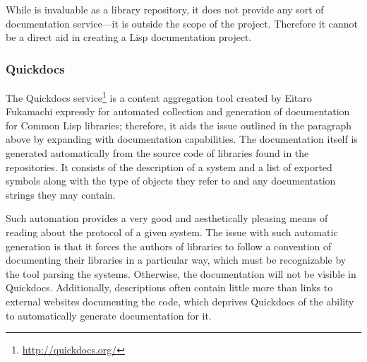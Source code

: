 While \ql{} is invaluable as a library repository, it does not provide any sort of documentation service---it is outside the scope of the \ql{} project. Therefore it cannot be a direct aid in creating a Lisp documentation project.

\subsubsection{Quickdocs}

The Quickdocs service\footnote{\url{http://quickdocs.org/}} is a content aggregation tool created by Eitaro Fukamachi expressly for automated collection and generation of documentation for Common Lisp libraries; therefore, it aids the issue outlined in the paragraph above by expanding \ql{} with documentation capabilities. The documentation itself is generated automatically from the source code of libraries found in the \ql{} repositories. It consists of the description of a \ql{} system and a list of exported symbols along with the type of objects they refer to and any documentation strings they may contain.

Such automation provides a very good and aesthetically pleasing means of reading about the protocol of a given system. The issue with such automatic generation is that it forces the authors of libraries to follow a convention of documenting their libraries in a particular way, which must be recognizable by the tool parsing the \ql{} systems. Otherwise, the documentation will not be visible in Quickdocs. Additionally, \ql{} descriptions often contain little more than links to external websites documenting the code, which deprives Quickdocs of the ability to automatically generate documentation for it.
